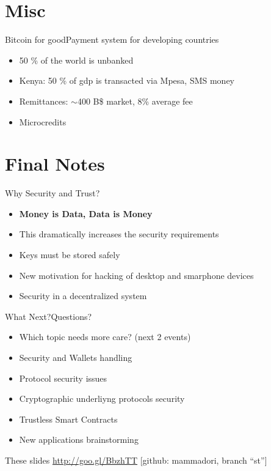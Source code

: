 \documentclass[english,compress]{beamer}
\begin{document}
\section{Misc}

\begin{frame}{Bitcoin for good}{Payment system for developing countries}
\begin{itemize}
 \item 50 \% of the world is unbanked
 \item Kenya: 50 \% of gdp is transacted via Mpesa, SMS money
 \item Remittances: $\sim$400 B\$ market, 8\% average fee
 \item Microcredits
\end{itemize}
\end{frame}

\section{Final Notes}

\begin{frame}{Why Security and Trust?}
\begin{itemize}
  \item \textbf{Money is Data, Data is Money}
  \item This dramatically increases the security requirements
  \item Keys must be stored safely
  \item New motivation for hacking of desktop and smarphone devices
  \item Security in a decentralized system
 \end{itemize}
\end{frame}


\begin{frame}{What Next?}{Questions?}
 \begin{itemize}
  \item Which topic needs more care? (next 2 events)
  \item Security and Wallets handling
  \item Protocol security issues
  \item Cryptographic underliyng protocols security
  \item Trustless Smart Contracts
  \item New applications brainstorming
 \end{itemize}
 
  \begin{block}{These slides}
  \url{http://goo.gl/BbzhTT} [github: mammadori, branch ``st'']
  \end{block}

\end{frame}
\end{document}
